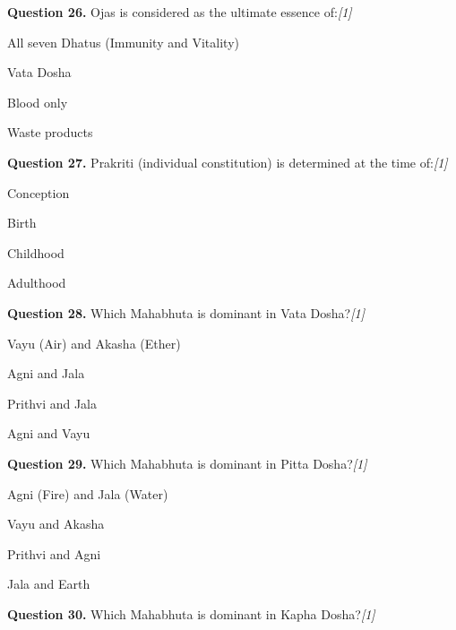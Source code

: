 \documentclass[11pt,a4paper]{article}
\newcommand{\pts}[1]{\hfill   \textit{[#1]}}
\begin{document}
\noindent   \textbf{Question 26.} Ojas is considered as the ultimate essence of:\pts{1}

\begin{parts}
  \item All seven Dhatus (Immunity and Vitality)
  \item Vata Dosha
  \item Blood only
  \item Waste products
\end{parts}

\medskip




\noindent   \textbf{Question 27.} Prakriti (individual constitution) is determined at the time of:\pts{1}

\begin{parts}
  \item Conception
  \item Birth
  \item Childhood
  \item Adulthood
\end{parts}

\medskip




\noindent   \textbf{Question 28.} Which Mahabhuta is dominant in Vata Dosha?\pts{1}

\begin{parts}
  \item Vayu (Air) and Akasha (Ether)
  \item Agni and Jala
  \item Prithvi and Jala
  \item Agni and Vayu
\end{parts}

\medskip




\noindent   \textbf{Question 29.} Which Mahabhuta is dominant in Pitta Dosha?\pts{1}

\begin{parts}
  \item Agni (Fire) and Jala (Water)
  \item Vayu and Akasha
  \item Prithvi and Agni
  \item Jala and Earth
\end{parts}

\medskip




\noindent   \textbf{Question 30.} Which Mahabhuta is dominant in Kapha Dosha?\pts{1}
\end{document}
